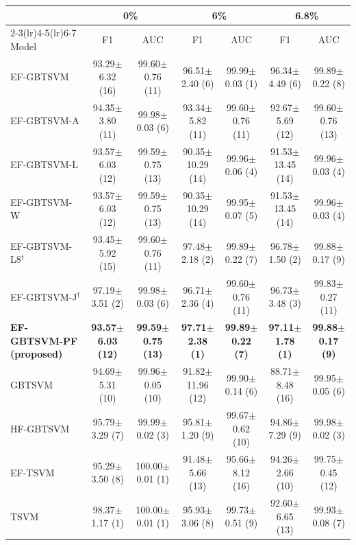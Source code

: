 \begin{tabular}{l*{6}{c}}
\toprule
&\multicolumn{2}{c}{0\%}&\multicolumn{2}{c}{6\%}&\multicolumn{2}{c}{6.8\%}\\
\cmidrule(lr){2-3}\cmidrule(lr){4-5}\cmidrule(lr){6-7}
Model & F1 & AUC & F1 & AUC & F1 & AUC \\
\midrule
EF-GBTSVM & 93.29$\pm$6.32 (16) & 99.60$\pm$0.76 (11) & 96.51$\pm$2.40 (6) & 99.99$\pm$0.03 (1) & 96.34$\pm$4.49 (6) & 99.89$\pm$0.22 (8) \\
EF-GBTSVM-A & 94.35$\pm$3.80 (11) & 99.98$\pm$0.03 (6) & 93.34$\pm$5.82 (11) & 99.60$\pm$0.76 (11) & 92.67$\pm$5.69 (12) & 99.60$\pm$0.76 (13) \\
EF-GBTSVM-L & 93.57$\pm$6.03 (12) & 99.59$\pm$0.75 (13) & 90.35$\pm$10.29 (14) & 99.96$\pm$0.06 (4) & 91.53$\pm$13.45 (14) & 99.96$\pm$0.03 (4) \\
EF-GBTSVM-W & 93.57$\pm$6.03 (12) & 99.59$\pm$0.75 (13) & 90.35$\pm$10.29 (14) & 99.95$\pm$0.07 (5) & 91.53$\pm$13.45 (14) & 99.96$\pm$0.03 (4) \\
EF-GBTSVM-L8$^{\dagger}$ & 93.45$\pm$5.92 (15) & 99.60$\pm$0.76 (11) & 97.48$\pm$2.18 (2) & 99.89$\pm$0.22 (7) & 96.78$\pm$1.50 (2) & 99.88$\pm$0.17 (9) \\
EF-GBTSVM-J$^{\dagger}$ & 97.19$\pm$3.51 (2) & 99.98$\pm$0.03 (6) & 96.71$\pm$2.36 (4) & 99.60$\pm$0.76 (11) & 96.73$\pm$3.48 (3) & 99.83$\pm$0.27 (11) \\
\cellcolor{proposedrow}\textbf{EF-GBTSVM-PF (proposed)} & \cellcolor{proposedrow}\textbf{93.57$\pm$6.03 (12)} & \cellcolor{proposedrow}\textbf{99.59$\pm$0.75 (13)} & \cellcolor{proposedrow}\textbf{97.71$\pm$2.38 (1)} & \cellcolor{proposedrow}\textbf{99.89$\pm$0.22 (7)} & \cellcolor{proposedrow}\textbf{97.11$\pm$1.78 (1)} & \cellcolor{proposedrow}\textbf{99.88$\pm$0.17 (9)} \\
GBTSVM & 94.69$\pm$5.31 (10) & 99.96$\pm$0.05 (10) & 91.82$\pm$11.96 (12) & 99.90$\pm$0.14 (6) & 88.71$\pm$8.48 (16) & 99.95$\pm$0.05 (6) \\
HF-GBTSVM & 95.79$\pm$3.29 (7) & 99.99$\pm$0.02 (3) & 95.81$\pm$1.20 (9) & 99.67$\pm$0.62 (10) & 94.86$\pm$7.29 (9) & 99.98$\pm$0.02 (3) \\
EF-TSVM & 95.29$\pm$3.50 (8) & 100.00$\pm$0.01 (1) & 91.48$\pm$5.66 (13) & 95.66$\pm$8.12 (16) & 94.26$\pm$2.66 (10) & 99.75$\pm$0.45 (12) \\
TSVM & 98.37$\pm$1.17 (1) & 100.00$\pm$0.01 (1) & 95.93$\pm$3.06 (8) & 99.73$\pm$0.51 (9) & 92.60$\pm$6.65 (13) & 99.93$\pm$0.08 (7) \\

\end{tabular}
